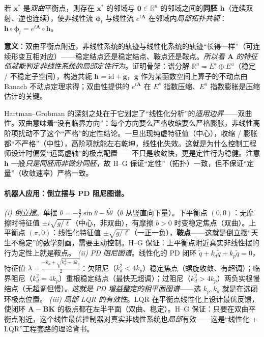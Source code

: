 \begin{theorem}\label{thm:hartman-grobman}
若 $\mathbf{x}^*$ 是\emph{双曲}平衡点，则存在 $\mathbf{x}^*$ 的邻域与 $\mathbf{0}\in\mathbb{R}^n$ 的邻域之间的\textbf{同胚 $\mathbf{h}$}（连续双射、逆也连续），使非线性流 $\boldsymbol{\phi}_t$ 与线性流 $e^{t\mathbf{A}}$ 在邻域内\emph{局部拓扑共轭}：$\mathbf{h}\circ\boldsymbol{\phi}_t=e^{t\mathbf{A}}\circ\mathbf{h}$。
\end{theorem}
\noindent\textbf{意义}：双曲平衡点附近，非线性系统的轨迹与线性化系统的轨迹“长得一样”（可连续形变互相对应）——稳定结点还是稳定结点、鞍点还是鞍点。\emph{所以看 $\mathbf{A}$ 的特征值就能判定非线性系统的局部定性行为}。证明骨架：谱分解 $\mathbb{R}^n=E^s\oplus E^u$（稳定 / 不稳定子空间），构造共轭 $\mathbf{h}=\mathrm{id}+\mathbf{g}$，$\mathbf{g}$ 作为某函数空间上算子的不动点由 Banach 不动点定理求得；双曲性提供的 $e^{t\mathbf{A}}$ 在 $E^s$ 指数压缩、$E^u$ 指数膨胀是压缩估计的关键。

\begin{insight}[双曲性 $=$ 线性化的鲁棒性]
Hartman--Grobman 的深刻之处在于它划定了“线性化分析”的\emph{适用边界}——双曲性。双曲意味着“没有临界方向”：每个方向要么严格收缩要么严格膨胀，非线性高阶项扰动不了这个“严格”的定性结论。一旦出现纯虚特征值（中心），收缩 / 膨胀都“不严格”（中性），高阶项就能左右乾坤，线性化失效。这就是为什么控制工程师设计时偏爱“远离虚轴”的极点配置——不只是收敛快，更是定性行为稳健。注意 $\mathbf{h}$ 一般\emph{只是同胚而非微分同胚}，故 H--G 保证“定性”（拓扑）一致，但不保证“定量”（收敛速率）严格一致。
\end{insight}

\paragraph{机器人应用：倒立摆与 PD 阻尼图谱。}
\emph{(i) 倒立摆}。单摆 $\ddot\theta=-\frac{g}{\ell}\sin\theta-b\dot\theta$（$\theta$ 从竖直向下量）。下平衡点 $(0,0)$：无摩擦时特征值 $\pm i\sqrt{g/\ell}$（中心，非双曲），有摩擦 $b>0$ 时变稳定焦点（双曲）。上平衡点 $(\pi,0)$：线性化特征值 $\pm\sqrt{g/\ell}$（一正一负），\textbf{鞍点}——这就是倒立摆“天生不稳定”的数学刻画，需要主动控制。H--G 保证：上平衡点附近真实非线性摆的行为定性上就是鞍点。
\emph{(ii) PD 阻尼图谱}。线性化的 PD 闭环 $\ddot{\tilde q}+k_d\dot{\tilde q}+k_p\tilde q=0$，特征值 $\lambda=\frac{-k_d\pm\sqrt{k_d^2-4k_p}}{2}$：欠阻尼（$k_d^2<4k_p$）稳定焦点（螺旋收敛、有超调）；临界阻尼（$k_d^2=4k_p$）重根稳定结点（最快无超调）；过阻尼（$k_d^2>4k_p$）两负实根慢结点（无超调但慢）。\emph{这就是 PD 增益整定的相平面图谱}——选 $k_p,k_d$ 就是在选闭环极点位置。
\emph{(iii) 局部 LQR 的有效性}。LQR 在平衡点线性化上设计最优反馈，使闭环 $\mathbf{A}-\mathbf{B}\mathbf{K}$ 的极点都在左半平面（双曲、稳定）。H--G 保证：只要在双曲平衡点附近，这个线性最优控制器对真实非线性系统也\emph{局部}有效——这是“线性化 $+$ LQR”工程套路的理论背书。

